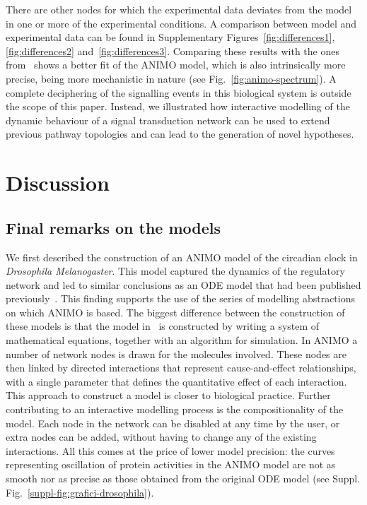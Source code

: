 \documentclass{bmcart}
\begin{document}
There are other nodes for which the experimental data deviates from the model in one or more of the experimental conditions.
A comparison between model and experimental data can be found in Supplementary Figures~\ref{fig:differences1}, \ref{fig:differences2} and~\ref{fig:differences3}.
Comparing these results with the ones from~\cite{pathway-fuzzy} shows a better fit of the ANIMO model, which is also intrinsically
more precise, being more mechanistic in nature (see Fig.~\ref{fig:animo-spectrum}).
A complete deciphering of the signalling events
in this biological system is outside the scope of this paper. Instead, we illustrated how interactive modelling of the dynamic behaviour
of a signal transduction network can be used to extend previous pathway topologies and can lead to the generation of novel hypotheses.







\section*{Discussion}
\subsection*{Final remarks on the models}
We first described the construction of an ANIMO
model of the circadian clock in \emph{Drosophila Melanogaster}. This model
captured the dynamics of the regulatory network and led to similar
conclusions as an ODE model that had been
published previously~\cite{drosophila-ode-model}. This finding supports the use of
the series of modelling abstractions on which ANIMO is based. The biggest
difference between the construction of these models is that the model in~\cite{drosophila-ode-model}
is constructed by writing a system of mathematical equations, together
with an algorithm for simulation. In ANIMO a number of network
nodes is drawn for the molecules involved.
These nodes are then linked by directed
interactions that represent cause-and-effect relationships, with a single parameter
that defines the quantitative effect of each
interaction. This approach to construct a model is closer to biological practice.
Further contributing to an interactive modelling process
is the compositionality of the model. Each node in the network
can be disabled at any time by the user, or extra nodes can be added,
without having to change any of the existing interactions.
All this comes at the price of lower model precision: the curves representing
oscillation of protein activities in the ANIMO model are not as smooth
nor as precise as those obtained from the original ODE model (see Suppl. Fig.~\ref{suppl-fig:grafici-drosophila}).
\end{document}
